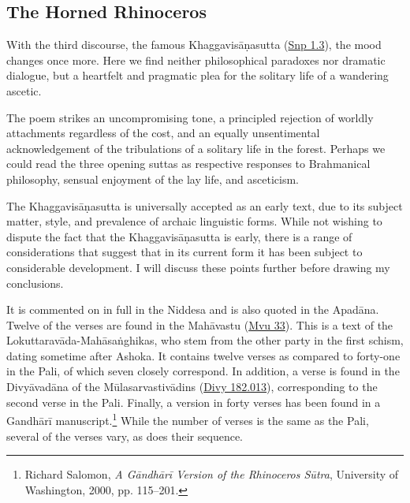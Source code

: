 \documentclass[12pt,openany]{book}%
\begin{document}
\subsection*{The Horned Rhinoceros}

With the third discourse, the famous \textsanskrit{Khaggavisāṇasutta} (\href{https://suttacentral.net/snp1.3/en/sujato}{Snp 1.3}), the mood changes once more. Here we find neither philosophical paradoxes nor dramatic dialogue, but a heartfelt and pragmatic plea for the solitary life of a wandering ascetic.

The poem strikes an uncompromising tone, a principled rejection of worldly attachments regardless of the cost, and an equally unsentimental acknowledgement of the tribulations of a solitary life in the forest. Perhaps we could read the three opening suttas as respective responses to Brahmanical philosophy, sensual enjoyment of the lay life, and asceticism.

The \textsanskrit{Khaggavisāṇasutta} is universally accepted as an early text, due to its subject matter, style, and prevalence of archaic linguistic forms. While not wishing to dispute the fact that the \textsanskrit{Khaggavisāṇasutta} is early, there is a range of considerations that suggest that in its current form it has been subject to considerable development. I will discuss these points further before drawing my conclusions.

It is commented on in full in the Niddesa and is also quoted in the \textsanskrit{Apadāna}. Twelve of the verses are found in the \textsanskrit{Mahāvastu} (\href{https://suttacentral.net/san{-}lo{-}mvu33/san/senart}{Mvu 33}). This is a text of the \textsanskrit{Lokuttaravāda}-\textsanskrit{Mahāsaṅghikas}, who stem from the other party in the first schism, dating sometime after Ashoka. It contains twelve verses as compared to forty-one in the Pali, of which seven closely correspond. In addition, a verse is found in the \textsanskrit{Divyāvadāna} of the \textsanskrit{Mūlasarvastivādins} (\href{https://suttacentral.net/divy20/san/vaidya\#vai182.013}{Divy 182.013}), corresponding to the second verse in the Pali. Finally, a version in forty verses has been found in a \textsanskrit{Gandhārī} manuscript.\footnote{Richard Salomon, \textit{A \textsanskrit{Gāndhārī} Version of the Rhinoceros \textsanskrit{Sūtra}}, University of Washington, 2000, pp. 115–201. } While the number of verses is the same as the Pali, several of the verses vary, as does their sequence.
\end{document}
